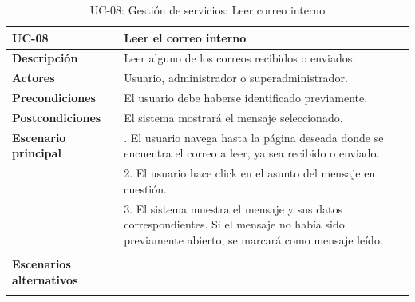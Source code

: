 \begin{table}
  \begin{center}
    \begin{tabularx}{16.4cm}{|l|X|}
      \hline
      \textbf{UC-08} & \textbf{Leer el correo interno}\\
      \hline
      \textbf{Descripción} & Leer alguno de los correos recibidos o enviados.\\
      \hline
      \textbf{Actores} & Usuario, administrador o superadministrador.\\
      \hline
      \textbf{Precondiciones} & El usuario debe haberse identificado previamente.\\
      \hline
      \textbf{Postcondiciones} & El sistema mostrará el mensaje seleccionado.\\
      \hline
      \textbf{Escenario principal} & \smallskip 1. El usuario navega hasta la página deseada donde se encuentra el correo a leer, ya sea recibido o enviado.\\
      & 2. El usuario hace click en el asunto del mensaje en cuestión.\\
      & 3. El sistema muestra el mensaje y sus datos correspondientes. Si el mensaje no había sido previamente abierto, se marcará como mensaje leído.\\
      & \\
      \hline
      \textbf{Escenarios alternativos} & \\
      & \\
      \hline
    \end{tabularx}
    \caption{UC-08: Gestión de servicios: Leer correo interno}
    \label{tab:CU-leer-correo}
  \end{center}
\end{table}


